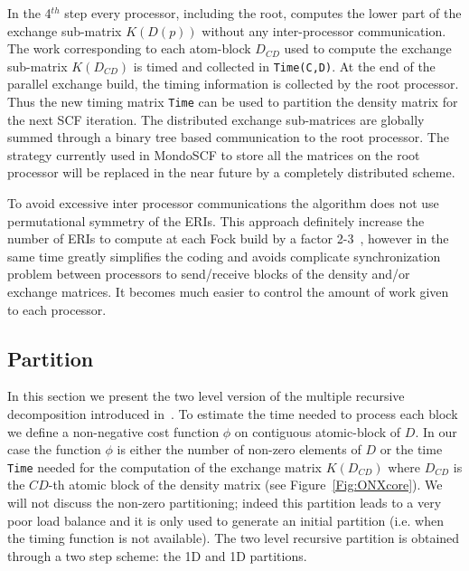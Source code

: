\documentclass[prl,twocolumn,showpacs,twocolumngrid,superbib]{revtex4}
\begin{document}
 In the 4$^{th}$ step every processor, including the root, computes 
 the lower part of the exchange sub-matrix $K(D(p))$ 
 without any inter-processor communication. 
 The work corresponding to each atom-block
 $D_{CD}$ used to compute the exchange 
 sub-matrix $K(D_{CD})$ is timed and collected in {\tt Time(C,D)}.
 At the end of the parallel exchange build, 
 the timing information is collected by the root processor.
 Thus the new timing matrix {\tt Time} can be used to partition the density 
 matrix for the next SCF iteration.
 The distributed exchange sub-matrices are globally 
 summed through a binary tree based communication to the root processor.
 The strategy currently used in {\sc MondoSCF} to store all the matrices on 
 the root processor will be replaced in the near future
 by a completely distributed scheme.
 
 To avoid excessive inter processor communications the algorithm 
 does not use permutational symmetry of the ERIs. This approach
 definitely increase the number of ERIs to compute at each Fock build by a factor 2-3~\cite{ESchwegler00},
 however in the same time greatly simplifies the coding and avoids complicate
 synchronization problem between processors to send/receive blocks of the 
 density and/or exchange matrices. It becomes much 
 easier to control the amount of work given to each processor.



\subsection{Partition}
 In this section we present the two level version of the multiple recursive 
 decomposition introduced in~\cite{LRomero95}.
 To estimate the time needed to process each block we define
 a non-negative cost function $\phi$ on contiguous atomic-block of
 $D$. In our case the function $\phi$ is either the number of 
 non-zero elements of $D$ or the time {\tt Time} needed for the computation
 of the exchange matrix $K(D_{CD})$ where $D_{CD}$ is the
 $CD$-th atomic block of the density matrix (see Figure~\ref{Fig:ONXcore}).
 We will not discuss the non-zero partitioning;
 indeed this partition leads to a very poor load balance and it is
 only used to generate an initial partition (i.e. when 
 the timing function is not available). 
 The two level recursive partition is obtained through 
 a two step scheme: the 1D and 1D partitions.
\end{document}
